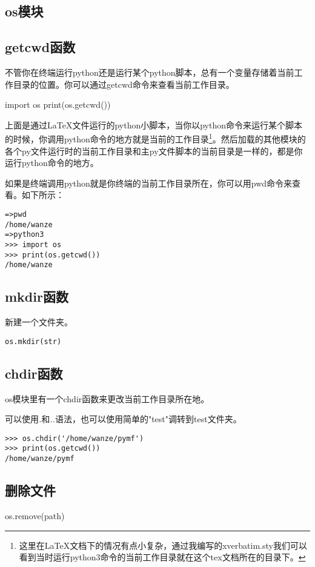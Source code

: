 \documentclass[12pt,oneside]{book}
\begin{document}
\begin{common-format}
\chapter{os模块}
\section{getcwd函数}
不管你在终端运行python还是运行某个python脚本，总有一个变量存储着当前工作目录的位置。你可以通过getcwd命令来查看当前工作目录。

\begin{tcbpython}[]
import os
print(os.getcwd())
\end{tcbpython}

上面是通过\LaTeX 文件运行的python小脚本，当你以python命令来运行某个脚本的时候，你调用python命令的地方就是当前的工作目录\footnote{这里在\LaTeX 文档下的情况有点小复杂，通过我编写的xverbatim.sty我们可以看到当时运行python3命令的当前工作目录就在这个tex文档所在的目录下。}。然后加载的其他模块的各个py文件运行时的当前工作目录和主py文件脚本的当前目录是一样的，都是你运行python命令的地方。

如果是终端调用python就是你终端的当前工作目录所在，你可以用pwd命令来查看。如下所示：
\begin{Verbatim}
=>pwd
/home/wanze
=>python3
>>> import os
>>> print(os.getcwd())
/home/wanze
\end{Verbatim}

\section{mkdir函数}
新建一个文件夹。
\begin{Verbatim}
os.mkdir(str)
\end{Verbatim}


\section{chdir函数}
os模块里有一个chdir函数来更改当前工作目录所在地。

可以使用\emph{.}和\emph{..}语法，也可以使用简单的"test"调转到test文件夹。
\begin{Verbatim}
>>> os.chdir('/home/wanze/pymf')
>>> print(os.getcwd())
/home/wanze/pymf
\end{Verbatim}

\section{删除文件}
os.remove(path)


\end{common-format}
\end{document}
